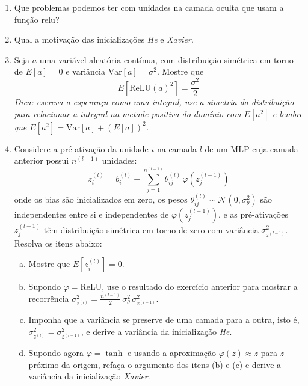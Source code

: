 \documentclass{dlproblemset}
\begin{document}
\begin{enumerate}[1)]
    \item Que problemas podemos ter com unidades na camada oculta que usam a função relu?

    \item Qual a motivação das inicializações \textit{He} e \textit{Xavier}.

    \item Seja $a$ uma variável aleatória contínua, com distribuição simétrica em torno de $E[a]=0$ e variância $\mathrm{Var}[a]=\sigma^2$. Mostre que
    \begin{equation*}
        E\!\left[\mathrm{ReLU}(a)^2\right]=\frac{\sigma^2}{2}
    \end{equation*}
    \textit{Dica: escreva a esperança como uma integral, use a simetria da distribuição para relacionar a integral na metade positiva do domínio com $E[a^2]$ e lembre que $E[a^2]=\mathrm{Var}[a]+(E[a])^2$.}

    \item Considere a pré-ativação da unidade $i$ na camada $l$ de um MLP cuja camada anterior possui $n^{(l-1)}$ unidades:
    \begin{equation*}
        z^{(l)}_i = b^{(l)}_i + \sum_{j=1}^{n^{(l-1)}}\theta^{(l)}_{ij}\,\varphi\!\left(z^{(l-1)}_j\right)
    \end{equation*}
    \noindent onde os bias são inicializados em zero, os pesos $\theta^{(l)}_{ij}\sim\mathcal{N}(0,\sigma_\theta^2)$ são independentes entre si e independentes de $\varphi(z^{(l-1)}_j)$, e as pré-ativações $z^{(l-1)}_j$ têm distribuição simétrica em torno de zero com variância $\sigma^2_{z^{(l-1)}}$. Resolva os itens abaixo:
    \begin{enumerate}[a)]
        \item Mostre que $E[z^{(l)}_i]=0$.
        \item Supondo $\varphi=\mathrm{ReLU}$, use o resultado do exercício anterior para mostrar a recorrência $\sigma^2_{z^{(l)}} = \frac{n^{(l-1)}}{2}\,\sigma_\theta^2\,\sigma^2_{z^{(l-1)}}$.
        \item Imponha que a variância se preserve de uma camada para a outra, isto é, $\sigma^2_{z^{(l)}}=\sigma^2_{z^{(l-1)}}$, e derive a variância da inicialização \textit{He}.
        \item Supondo agora $\varphi=\tanh$ e usando a aproximação $\varphi(z)\approx z$ para $z$ próximo da origem, refaça o argumento dos itens (b) e (c) e derive a variância da inicialização \textit{Xavier}.
    \end{enumerate}


\end{enumerate}
\end{document}
